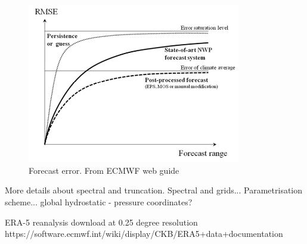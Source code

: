 \begin{figure}
	
	\includegraphics[width=22pc,angle=0]{forecast_error.png}
	\caption{Forecast error. From ECMWF web guide}\label{fig:forecast_error}
	\centering
\end{figure}


More details about spectral and truncation. Spectral and grids...
Parametrisation scheme...
global
hydrostatic - pressure coordinates?




ERA-5 reanalysis download at 0.25 degree resolution
https://software.ecmwf.int/wiki/display/CKB/ERA5+data+documentation


